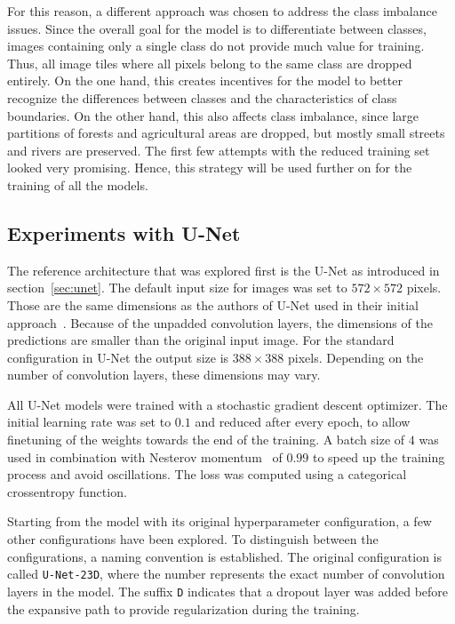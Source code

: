 For this reason, a different approach was chosen to address the class imbalance issues. Since the overall goal for the model is to differentiate between classes, images containing only a single class do not provide much value for training. Thus, all image tiles where all pixels belong to the same class are dropped entirely. On the one hand, this creates incentives for the model to better recognize the differences between classes and the characteristics of class boundaries. On the other hand, this also affects class imbalance, since large partitions of forests and agricultural areas are dropped, but mostly small streets and rivers are preserved. The first few attempts with the reduced training set looked    very promising. Hence, this strategy will be used further on for the training of all the models.

\subsection{Experiments with U-Net}
\label{sec:unet_experiments}
The reference architecture that was explored first is the U-Net as introduced in section~\ref{sec:unet}. The default input size for images was set to $572\times 572$ pixels. Those are the same dimensions as the authors of U-Net used in their initial approach~\cite{unet15}. Because of the unpadded convolution layers, the dimensions of the predictions are smaller than the original input image. For the standard configuration in U-Net the output size is $388\times 388$ pixels. Depending on the number of convolution layers, these dimensions may vary.

All U-Net models were trained with a stochastic gradient descent optimizer. The initial learning rate was set to $0.1$ and reduced after every epoch, to allow finetuning of the weights towards the end of the training. A batch size of $4$ was used in combination with Nesterov momentum~\cite{nesterov83} of $0.99$ to speed up the training process and avoid oscillations. The loss was computed using a categorical crossentropy function.

Starting from the model with its original hyperparameter configuration, a few other configurations have been explored. To distinguish between the configurations, a naming convention is established. The original configuration is called \texttt{U-Net-23D}, where the number represents the exact number of convolution layers in the model. The suffix \texttt{D} indicates that a dropout layer was added before the expansive path to provide regularization during the training.


